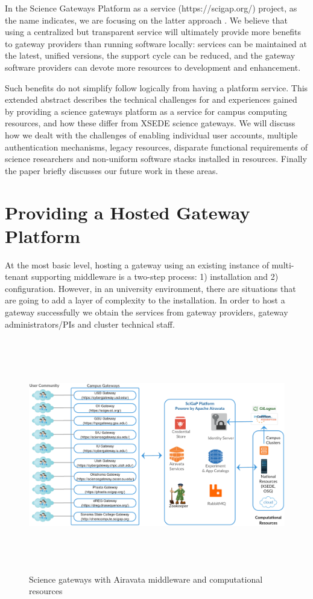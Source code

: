 \documentclass[sigconf]{acmart}
\begin{document}
In the Science Gateways Platform as a service (https://scigap.org/) project, as the name indicates, we are focusing on the latter approach \cite{pierce2015patching}. We believe that using a centralized but transparent service will ultimately provide more benefits to gateway providers than running software locally: services can be maintained at the latest, unified versions, the support cycle can be reduced, and the gateway software providers can devote more resources to development and enhancement. 

Such benefits do not simplify follow logically from having a platform service. This extended abstract describes the technical challenges for and experiences gained by providing a science gateways platform as a service for campus computing resources, and how these differ from XSEDE science gateways. We will discuss how we dealt with the challenges of enabling individual user accounts, multiple authentication mechanisms, legacy resources, disparate functional requirements of science researchers and non-uniform software stacks installed in resources. Finally the paper briefly discusses our future work in these areas.

\section{Providing a Hosted Gateway Platform}
At the most basic level, hosting a gateway using an existing instance of multi-tenant supporting middleware is a two-step process: 1) installation and 2) configuration.  However, in an university environment, there are situations that are going to add a layer of complexity to the installation. In order to host a gateway successfully we obtain the services from gateway providers, gateway administrators/PIs and cluster technical staff.  

\begin{figure}
\includegraphics[height=4in, width=7in]{figures/gateway_deployments.pdf}
\caption{Science gateways with Airavata middleware and computational resources}
\end{figure}
\end{document}
